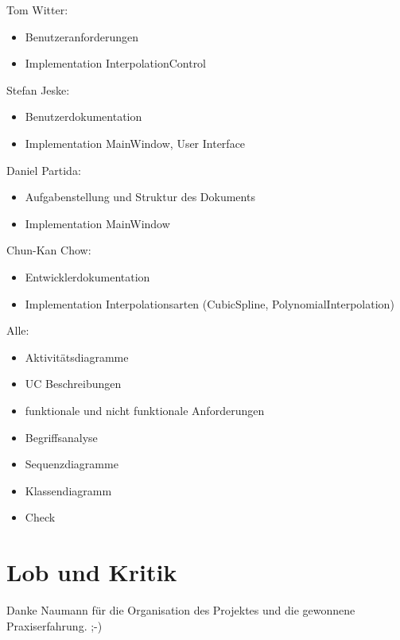 Tom Witter:
\begin{itemize}
\item Benutzeranforderungen
\item Implementation InterpolationControl
\end{itemize}
Stefan Jeske:
\begin{itemize}
\item Benutzerdokumentation
\item Implementation MainWindow, User Interface
\end{itemize}
Daniel Partida:
\begin{itemize}
\item Aufgabenstellung und Struktur des Dokuments
\item Implementation MainWindow
\end{itemize}
Chun-Kan Chow:
\begin{itemize}
\item Entwicklerdokumentation
\item Implementation Interpolationsarten (CubicSpline, PolynomialInterpolation)
\end{itemize}
Alle:
\begin{itemize}
\item Aktivit\"atsdiagramme
\item UC Beschreibungen
\item funktionale und nicht funktionale Anforderungen
\item Begriffsanalyse
\item Sequenzdiagramme
\item Klassendiagramm
\item Check
\end{itemize}


\section{Lob und Kritik}
\label{sec:1.3}

Danke Naumann f\"ur die Organisation des Projektes und die gewonnene Praxiserfahrung. ;-)


